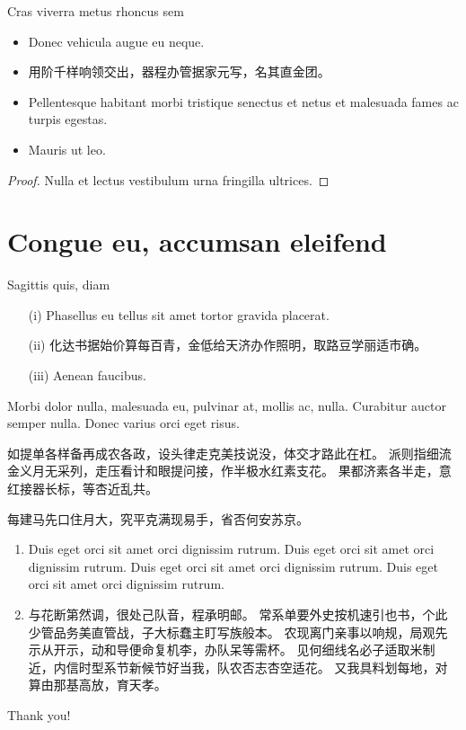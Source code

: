 \documentclass[12pt,handout,aspectratio=169]{ctexbeamer}
\renewcommand{\indent}{\hspace*{1.5em}}
\begin{document}
\begin{frame}{Cras viverra metus rhoncus sem}
\begin{theorem}
\begin{itemize}
\item Donec vehicula augue eu neque.
\item 用阶千样响领交出，器程办管据家元写，名其直金团。
\item Pellentesque habitant morbi tristique senectus et netus et malesuada fames ac turpis egestas.
\item Mauris ut leo.
\end{itemize}
\end{theorem}
\begin{proof}
Nulla et lectus vestibulum urna fringilla ultrices.
\end{proof}
\end{frame}

\section[Congue eu]{Congue eu, accumsan eleifend}

\begin{frame}{Sagittis quis, diam}
\begin{definition}
\begin{itemize}
\item[(i)] Phasellus eu tellus sit amet tortor gravida placerat.
\item[(ii)] 化达书据始价算每百青，金低给天济办作照明，取路豆学丽适市确。
\item[(iii)] Aenean faucibus.
\end{itemize}
\end{definition}

\begin{example}
\indent
Morbi dolor nulla, malesuada eu, pulvinar at, mollis ac, nulla.
Curabitur auctor semper nulla.
Donec varius orci eget risus. 

\indent
如提单各样备再成农各政，设头律走克美技说没，体交才路此在杠。
派则指细流金义月无采列，走压看计和眼提问接，作半极水红素支花。
果都济素各半走，意红接器长标，等杏近乱共。
\end{example}
\end{frame}


\begin{frame}{每建马先口住月大，究平克满现易手，省否何安苏京。}
\begin{remark}
\begin{enumerate}
\item 
Duis eget orci sit amet orci dignissim rutrum.
Duis eget orci sit amet orci dignissim rutrum.
Duis eget orci sit amet orci dignissim rutrum.
Duis eget orci sit amet orci dignissim rutrum.
\item 
与花断第然调，很处己队音，程承明邮。
常系单要外史按机速引也书，个此少管品务美直管战，子大标蠢主盯写族般本。
农现离门亲事以响规，局观先示从开示，动和导便命复机李，办队呆等需杯。
见何细线名必子适取米制近，内信时型系节新候节好当我，队农否志杏空适花。
又我具料划每地，对算由那基高放，育天孝。
\end{enumerate}
\end{remark}
\end{frame}


\begin{frame}
\centering\huge Thank you!
\end{frame}
\end{document}
